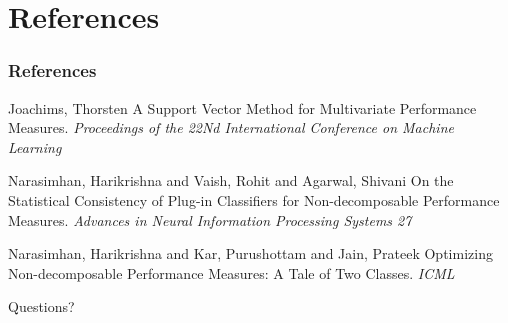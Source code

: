 \documentclass{beamer}
\begin{document}


\section{References} %

\begin{frame}
	\frametitle{References}
	\footnotesize{
		\begin{thebibliography}{99} %
			 Joachims, Thorsten
			\newblock A Support Vector Method for Multivariate Performance Measures.
			\newblock \emph{Proceedings of the 22Nd International Conference on Machine Learning}
			
			
			 Narasimhan, Harikrishna and Vaish, Rohit and Agarwal, Shivani
			\newblock On the Statistical Consistency of Plug-in Classifiers for Non-decomposable Performance Measures.
			\newblock \emph{Advances in Neural Information Processing Systems 27}
			
			 Narasimhan, Harikrishna and Kar, Purushottam and Jain, Prateek
			\newblock Optimizing Non-decomposable Performance Measures: A Tale of Two Classes.
			\newblock \emph{ICML}
			
			
			
		\end{thebibliography}
	}
\end{frame}


\begin{frame}
	\Huge{\centerline{Questions?}}
\end{frame}

\end{document}
